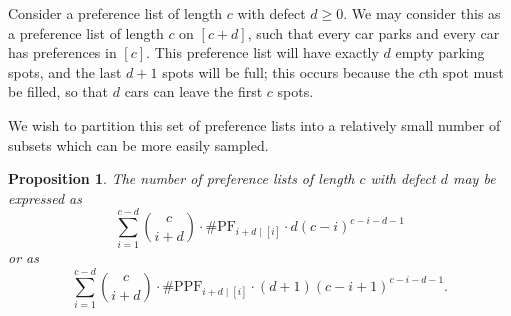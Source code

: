 \documentclass[12 pt]{amsart}
\newtheorem{proposition}[theorem]{Proposition}
\theoremstyle{definition} %
\theoremstyle{remark} %
\begin{document}


Consider a preference list of length $c$ with defect $d\ge 0$. We may consider this as a preference list of length $c$ on $[c+d]$, such that every car parks and every car has preferences in $[c]$. This preference list will have exactly $d$ empty parking spots, and the last $d+1$ spots will be full; this occurs because the $c$th spot must be filled, so that $d$ cars can leave the first $c$ spots.

We wish to partition this set of preference lists into a relatively small number of subsets which can be more easily sampled.

\begin{proposition}
    The number of preference lists of length $c$ with defect $d$ may be expressed as \[\sum_{i=1}^{c-d} \binom{c}{i+d}\cdot\# \mathrm{PF}_{i+d \mid [i]}\cdot d(c-i)^{c-i-d-1}\] or as \[\sum_{i=1}^{c-d} \binom{c}{i+d}\cdot\# \mathrm{PPF}_{i+d \mid [i]}\cdot (d+1)(c-i+1)^{c-i-d-1}.\]
\end{proposition}
\end{document}

